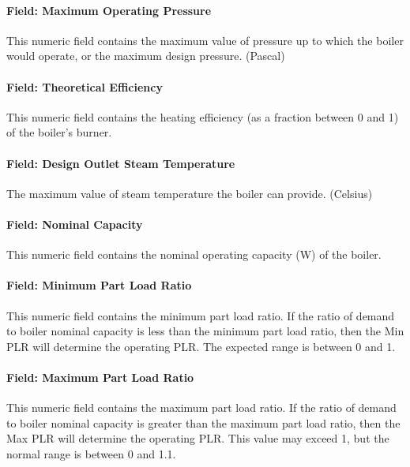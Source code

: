 \paragraph{Field: Maximum Operating Pressure}\label{field-maximum-operating-pressure}

This numeric field contains the maximum value of pressure up to which the boiler would operate, or the maximum design pressure. (Pascal)

\paragraph{Field: Theoretical Efficiency}\label{field-theoretical-efficiency}

This numeric field contains the heating efficiency (as a fraction between 0 and 1) of the boiler's burner.

\paragraph{Field: Design Outlet Steam Temperature}\label{field-design-outlet-steam-temperature}

The maximum value of steam temperature the boiler can provide. (Celsius)

\paragraph{Field: Nominal Capacity}\label{field-nominal-capacity-7}

This numeric field contains the nominal operating capacity (W) of the boiler.

\paragraph{Field: Minimum Part Load Ratio}\label{field-minimum-part-load-ratio-10}

This numeric field contains the minimum part load ratio. If the ratio of demand to boiler nominal capacity is less than the minimum part load ratio, then the Min PLR will determine the operating PLR. The expected range is between 0 and 1.

\paragraph{Field: Maximum Part Load Ratio}\label{field-maximum-part-load-ratio-10}

This numeric field contains the maximum part load ratio. If the ratio of demand to boiler nominal capacity is greater than the maximum part load ratio, then the Max PLR will determine the operating PLR. This value may exceed 1, but the normal range is between 0 and 1.1.

